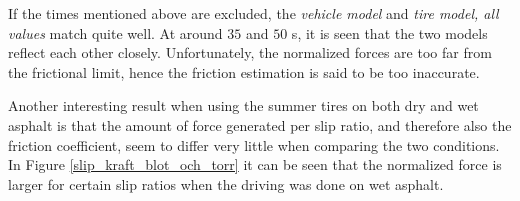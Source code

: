 If the times mentioned above are excluded, the \textit{vehicle model} and \textit{tire model, all values} match quite well. At around $ 35 $ and $ 50 $ s, it is seen that the two models reflect each other closely. Unfortunately, the normalized forces are too far from the frictional limit, hence the friction estimation is said to be too inaccurate.

Another interesting result when using the summer tires on both dry and wet asphalt is that the amount of force generated per slip ratio, and therefore also the friction coefficient, seem to differ very little when comparing the two conditions. In Figure \ref{slip_kraft_blot_och_torr} it can be seen that the normalized force is larger for certain slip ratios when the driving was done on wet asphalt.
